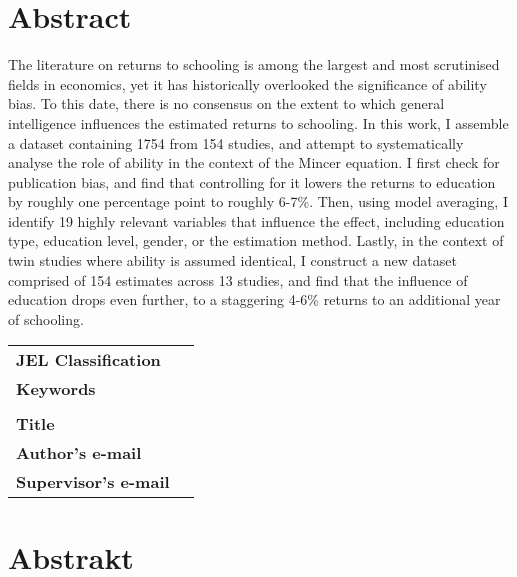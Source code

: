 \section*{Abstract}

The literature on returns to schooling is among the largest and most scrutinised fields in economics, yet it has historically overlooked the significance of ability bias. To this date, there is no consensus on the extent to which general intelligence influences the estimated returns to schooling. In this work, I assemble a dataset containing 1754 from 154 studies, and attempt to systematically analyse the role of ability in the context of the Mincer equation. I first check for publication bias, and find that controlling for it lowers the returns to education by roughly one percentage point to roughly 6-7\%. Then, using model averaging, I identify 19 highly relevant variables that influence the effect, including education type, education level, gender, or the estimation method. Lastly, in the context of twin studies  where ability is assumed identical, I construct a new dataset comprised of 154 estimates across 13 studies, and find that the influence of education drops even further, to a staggering 4-6\% returns to an additional year of schooling.



\bigskip

\begin{tabular}{lp{8.6cm}}
	\textbf{JEL Classification}  & \JEL                                        \\
	\textbf{Keywords}            & \Keywords                                   \\
	                             &                                             \\
	\textbf{Title}               & \Bookname                                   \\
	\textbf{Author's e-mail}     & \texttt{\href{mailto:\Email}{\Email}}       \\
	\textbf{Supervisor's e-mail} & \texttt{\href{mailto:\EmailSup}{\EmailSup}} \\
\end{tabular}

\clearpage

\section*{Abstrakt}\label{abstract}

